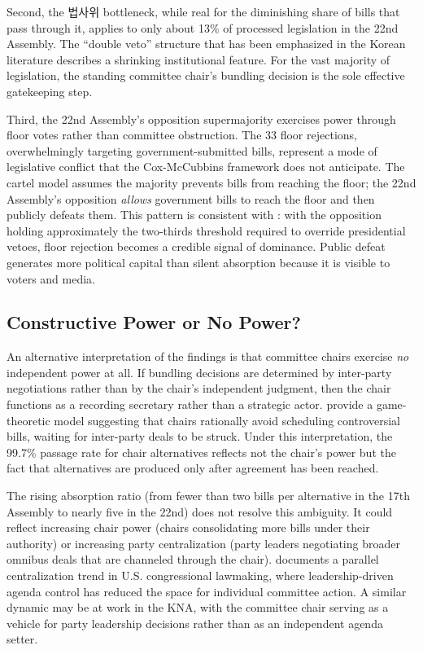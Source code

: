 \documentclass[11pt]{article}
\begin{document}
Second, the 법사위 bottleneck, while real for the diminishing share of bills that pass through it, applies to only about 13\% of processed legislation in the 22nd Assembly. The ``double veto'' structure that has been emphasized in the Korean literature \citep{ko2017} describes a shrinking institutional feature. For the vast majority of legislation, the standing committee chair's bundling decision is the sole effective gatekeeping step.

Third, the 22nd Assembly's opposition supermajority exercises power through floor votes rather than committee obstruction. The 33 floor rejections, overwhelmingly targeting government-submitted bills, represent a mode of legislative conflict that the Cox-McCubbins framework does not anticipate. The cartel model assumes the majority prevents bills from reaching the floor; the 22nd Assembly's opposition \textit{allows} government bills to reach the floor and then publicly defeats them. This pattern is consistent with \citet{tsebelis2002}: with the opposition holding approximately the two-thirds threshold required to override presidential vetoes, floor rejection becomes a credible signal of dominance. Public defeat generates more political capital than silent absorption because it is visible to voters and media.

\subsection{Constructive Power or No Power?}

An alternative interpretation of the findings is that committee chairs exercise \textit{no} independent power at all. If bundling decisions are determined by inter-party negotiations rather than by the chair's independent judgment, then the chair functions as a recording secretary rather than a strategic actor. \citet{seoyoon2020} provide a game-theoretic model suggesting that chairs rationally avoid scheduling controversial bills, waiting for inter-party deals to be struck. Under this interpretation, the 99.7\% passage rate for chair alternatives reflects not the chair's power but the fact that alternatives are produced only after agreement has been reached.

The rising absorption ratio (from fewer than two bills per alternative in the 17th Assembly to nearly five in the 22nd) does not resolve this ambiguity. It could reflect increasing chair power (chairs consolidating more bills under their authority) or increasing party centralization (party leaders negotiating broader omnibus deals that are channeled through the chair). \citet{lewallen2017} documents a parallel centralization trend in U.S. congressional lawmaking, where leadership-driven agenda control has reduced the space for individual committee action. A similar dynamic may be at work in the KNA, with the committee chair serving as a vehicle for party leadership decisions rather than as an independent agenda setter.
\end{document}
